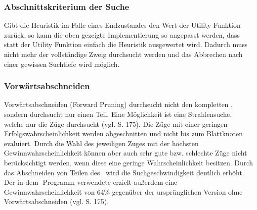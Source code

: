 \subsubsection{Abschnittskriterium der Suche}
\label{ab-depth-limited}
Gibt die Heuristik im Falle eines Endzustandes den Wert der Utility Funktion zurück, so kann die oben gezeigte Implementierung so angepasst werden, dass statt der Utility Funktion einfach die Heuristik ausgewertet wird. Dadurch muss nicht mehr der vollständige Zweig durchsucht werden und das Abbrechen nach einer gewissen Suchtiefe wird möglich.
 
\subsubsection{Vorwärtsabschneiden}
\authorpatrick
Vorwärtsabschneiden (Forward Pruning) durchsucht nicht den kompletten \gtree , sondern durchsucht nur einen Teil. Eine Möglichkeit ist eine Strahlensuche, welche nur die  Züge durchsucht (vgl. \cite{Russell.2016} S. 175). Die Züge mit einer geringen Erfolgswahrscheinlichkeit werden abgeschnitten und nicht bis zum Blattknoten evaluiert. Durch die Wahl des jeweiligen Zuges mit der höchsten Gewinnwahrscheinlichkeit können aber auch sehr gute bzw. schlechte Züge nicht berücksichtigt werden, wenn diese eine geringe Wahrscheinlichkeit besitzen. Durch das Abschneiden von Teilen des \gtree\ wird die Suchgeschwindigkeit deutlich erhöht. Der in dem \ot -Programm  verwendete  erzielt außerdem eine Gewinnwahrscheinlichkeit von 64\% gegenüber der ursprünglichen Version ohne Vorwärtsabschneiden (vgl. \cite{Russell.2016} S. 175).
